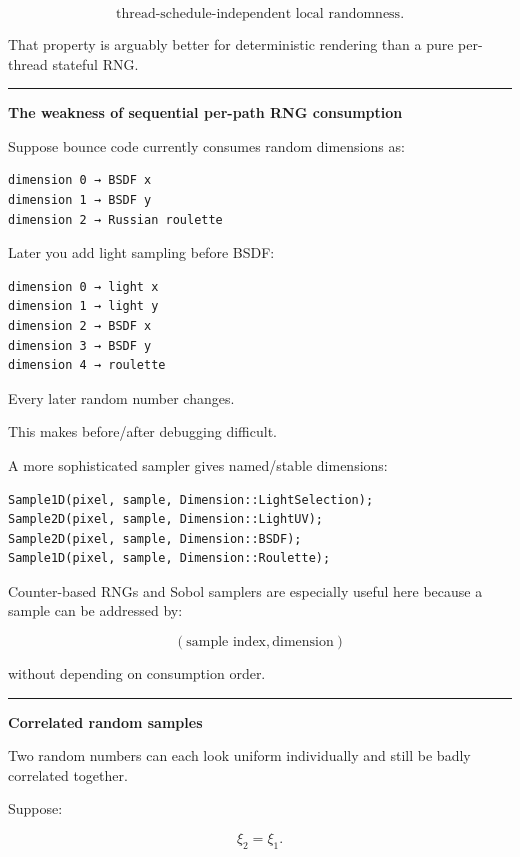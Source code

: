 \[
\boxed{
\text{thread-schedule-independent local randomness}.
}
\]

That property is arguably better for deterministic rendering than a pure per-thread stateful RNG.

\begin{center}\rule{0.5\linewidth}{0.5pt}\end{center}

\textbf{The weakness of sequential per-path RNG consumption}

Suppose bounce code currently consumes random dimensions as:

\begin{verbatim}
dimension 0 → BSDF x
dimension 1 → BSDF y
dimension 2 → Russian roulette
\end{verbatim}

Later you add light sampling before BSDF:

\begin{verbatim}
dimension 0 → light x
dimension 1 → light y
dimension 2 → BSDF x
dimension 3 → BSDF y
dimension 4 → roulette
\end{verbatim}

Every later random number changes.

This makes before/after debugging difficult.

A more sophisticated sampler gives named/stable dimensions:

\begin{verbatim}
Sample1D(pixel, sample, Dimension::LightSelection);
Sample2D(pixel, sample, Dimension::LightUV);
Sample2D(pixel, sample, Dimension::BSDF);
Sample1D(pixel, sample, Dimension::Roulette);
\end{verbatim}

Counter-based RNGs and Sobol samplers are especially useful here because a sample can be addressed by:

\[
(\text{sample index},\text{dimension})
\]

without depending on consumption order.

\begin{center}\rule{0.5\linewidth}{0.5pt}\end{center}

\textbf{Correlated random samples}

Two random numbers can each look uniform individually and still be badly correlated together.

Suppose:

\[
\xi_2=\xi_1.
\]

